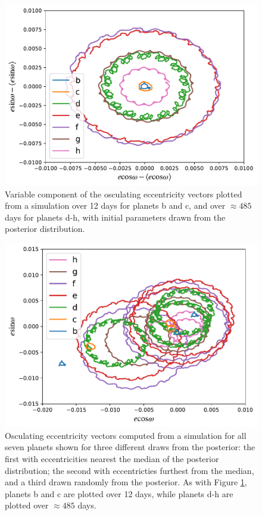 \documentclass[twocolumn]{aastex63}
\begin{document}
\begin{figure}
    \centering
    \includegraphics[width=\hsize]{figures/T1_evector_forced.pdf}
    \caption{Variable component of the osculating eccentricity vectors plotted from a simulation over 12 days for planets b and c, and over $\approx 485$
    days for planets d-h, with initial parameters drawn from the posterior distribution.}
    \label{fig:forced_eccentricity}
\end{figure}

\begin{figure}
    \centering
    \includegraphics[width=\hsize]{figures/T1_evector.pdf}
    \caption{Osculating eccentricity vectors computed from a simulation for all seven planets shown for three different draws from
    the posterior:  the first with eccentricities nearest the median of the posterior distribution;
    the second with eccentricties furthest from the median, and a third drawn randomly from
    the posterior.  As with Figure \ref{fig:forced_eccentricity}, planets b and c are plotted
    over 12 days, while planets d-h are plotted over $\approx 485$ days.}
    \label{fig:total_eccentricity}
\end{figure}
\end{document}
